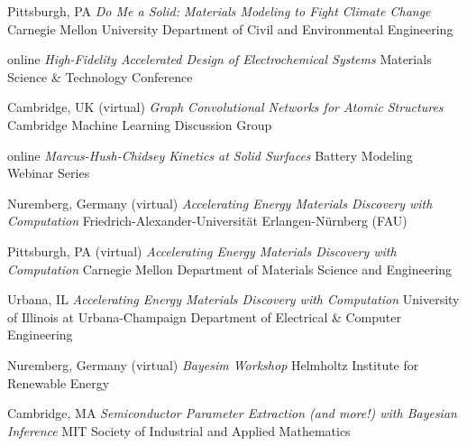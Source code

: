 \vspace{\talksep}
\datedsubsection{}
    {Pittsburgh, PA}
    {\textit{Do Me a Solid: Materials Modeling to Fight Climate Change}}
    {Carnegie Mellon University Department of Civil and Environmental Engineering}

\vspace{\talkyearsep}
    {online}
    {\textit{High-Fidelity Accelerated Design of Electrochemical Systems}}
    {Materials Science \& Technology Conference}

\vspace{\talksep}
\datedsubsection{}
    {Cambridge, UK (virtual)}
    {\textit{Graph Convolutional Networks for Atomic Structures}}
    {Cambridge Machine Learning Discussion Group}

\vspace{\talksep}
\datedsubsection{}
    {online}
    {\textit{Marcus-Hush-Chidsey Kinetics at Solid Surfaces}}
    {Battery Modeling Webinar Series}

\vspace{\talksep}
\datedsubsection{}
    {Nuremberg, Germany (virtual)}
    {\textit{Accelerating Energy Materials Discovery with Computation}}
    {Friedrich-Alexander-Universit\"at Erlangen-N\"urnberg (FAU)}

\vspace{\talksep}
\datedsubsection{}
    {Pittsburgh, PA (virtual)}
    {\textit{Accelerating Energy Materials Discovery with Computation}}
    {Carnegie Mellon Department of Materials Science and Engineering}

\vspace{\talksep}
\datedsubsection{}
    {Urbana, IL}
    {\textit{Accelerating Energy Materials Discovery with Computation}}
    {University of Illinois at Urbana-Champaign Department of Electrical \& Computer Engineering}

\vspace{\talkyearsep}
    {Nuremberg, Germany (virtual)}
    {\textit{Bayesim Workshop}}
    {Helmholtz Institute for Renewable Energy}

\vspace{\talksep}
    {Cambridge, MA}
    {\textit{Semiconductor Parameter Extraction (and more!) with Bayesian Inference}}
    {MIT Society of Industrial and Applied Mathematics}

